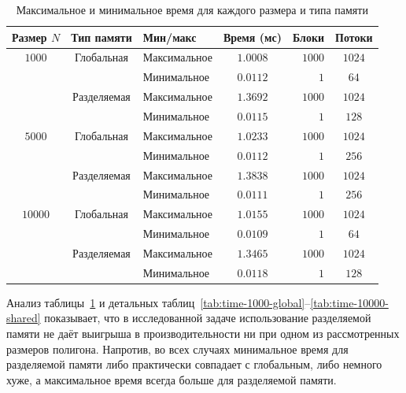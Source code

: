 \documentclass{article}[14pt]
\begin{document}
\begin{table}[H]
\centering
\caption{Максимальное и минимальное время для каждого размера и типа памяти}
\label{tab:minmax}
\begin{tabular}{cclcrc}
\toprule
\textbf{Размер $N$} & \textbf{Тип памяти} & \textbf{Мин/макс} & \textbf{Время (мс)} & \textbf{Блоки} & \textbf{Потоки} \\
\midrule
$1000$    & Глобальная  & Максимальное & $1.0008$ & $1000$ & $1024$ \\
          &             & Минимальное  & $0.0112$ & $1$    & $64$   \\
          & Разделяемая & Максимальное & $1.3692$ & $1000$ & $1024$ \\
          &             & Минимальное  & $0.0115$ & $1$    & $128$  \\
\midrule
$5000$    & Глобальная  & Максимальное & $1.0233$ & $1000$ & $1024$ \\
          &             & Минимальное  & $0.0112$ & $1$    & $256$  \\
          & Разделяемая & Максимальное & $1.3838$ & $1000$ & $1024$ \\
          &             & Минимальное  & $0.0111$ & $1$    & $256$  \\
\midrule
$10000$   & Глобальная  & Максимальное & $1.0155$ & $1000$ & $1024$ \\
          &             & Минимальное  & $0.0109$ & $1$    & $64$   \\
          & Разделяемая & Максимальное & $1.3465$ & $1000$ & $1024$ \\
          &             & Минимальное  & $0.0118$ & $1$    & $128$  \\
\bottomrule
\end{tabular}
\end{table}

Анализ таблицы~\ref{tab:minmax} и детальных таблиц~\ref{tab:time-1000-global}--\ref{tab:time-10000-shared} показывает, что в исследованной задаче использование разделяемой памяти не даёт выигрыша в производительности ни при одном из рассмотренных размеров полигона.  
Напротив, во всех случаях минимальное время для разделяемой памяти либо практически совпадает с глобальным, либо немного хуже, а максимальное время всегда больше для разделяемой памяти.
\end{document}

